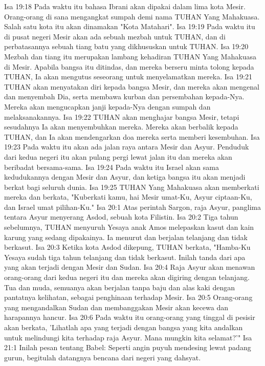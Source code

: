 Isa 19:18  Pada waktu itu bahasa Ibrani akan dipakai dalam lima kota Mesir. Orang-orang di sana mengangkat sumpah demi nama TUHAN Yang Mahakuasa. Salah satu kota itu akan dinamakan "Kota Matahari".
Isa 19:19  Pada waktu itu di pusat negeri Mesir akan ada sebuah mezbah untuk TUHAN, dan di perbatasannya sebuah tiang batu yang dikhususkan untuk TUHAN.
Isa 19:20  Mezbah dan tiang itu merupakan lambang kehadiran TUHAN Yang Mahakuasa di Mesir. Apabila bangsa itu ditindas, dan mereka berseru minta tolong kepada TUHAN, Ia akan mengutus seseorang untuk menyelamatkan mereka.
Isa 19:21  TUHAN akan menyatakan diri kepada bangsa Mesir, dan mereka akan mengenal dan menyembah Dia, serta membawa kurban dan persembahan kepada-Nya. Mereka akan mengucapkan janji kepada-Nya dengan sumpah dan melaksanakannya.
Isa 19:22  TUHAN akan menghajar bangsa Mesir, tetapi sesudahnya Ia akan menyembuhkan mereka. Mereka akan berbalik kepada TUHAN, dan Ia akan mendengarkan doa mereka serta memberi kesembuhan.
Isa 19:23  Pada waktu itu akan ada jalan raya antara Mesir dan Asyur. Penduduk dari kedua negeri itu akan pulang pergi lewat jalan itu dan mereka akan beribadat bersama-sama.
Isa 19:24  Pada waktu itu Israel akan sama kedudukannya dengan Mesir dan Asyur, dan ketiga bangsa itu akan menjadi berkat bagi seluruh dunia.
Isa 19:25  TUHAN Yang Mahakuasa akan memberkati mereka dan berkata, "Kuberkati kamu, hai Mesir umat-Ku, Asyur ciptaan-Ku, dan Israel umat pilihan-Ku."
Isa 20:1  Atas perintah Sargon, raja Asyur, panglima tentara Asyur menyerang Asdod, sebuah kota Filistin.
Isa 20:2  Tiga tahun sebelumnya, TUHAN menyuruh Yesaya anak Amos melepaskan kasut dan kain karung yang sedang dipakainya. Ia menurut dan berjalan telanjang dan tidak berkasut.
Isa 20:3  Ketika kota Asdod dikepung, TUHAN berkata, "Hamba-Ku Yesaya sudah tiga tahun telanjang dan tidak berkasut. Inilah tanda dari apa yang akan terjadi dengan Mesir dan Sudan.
Isa 20:4  Raja Asyur akan menawan orang-orang dari kedua negeri itu dan mereka akan digiring dengan telanjang. Tua dan muda, semuanya akan berjalan tanpa baju dan alas kaki dengan pantatnya kelihatan, sebagai penghinaan terhadap Mesir.
Isa 20:5  Orang-orang yang mengandalkan Sudan dan membanggakan Mesir akan kecewa dan harapannya hancur.
Isa 20:6  Pada waktu itu orang-orang yang tinggal di pesisir akan berkata, 'Lihatlah apa yang terjadi dengan bangsa yang kita andalkan untuk melindungi kita terhadap raja Asyur. Mana mungkin kita selamat?'"
Isa 21:1  Inilah pesan tentang Babel: Seperti angin puyuh mendesing lewat padang gurun, begitulah datangnya bencana dari negeri yang dahsyat.
